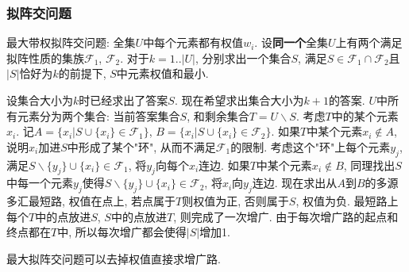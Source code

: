 \subsubsection{拟阵交问题}
最大带权拟阵交问题: 全集$U$中每个元素都有权值$w_i$. 设\textbf{同一个}全集$U$上有两个满足拟阵性质的集族$\mathcal{F}_1$, $\mathcal{F}_2$. 对于$k=1..|U|$, 分别求出一个集合$S$, 满足$S\in \mathcal{F}_1 \cap\mathcal{F}_2$且$|S|$恰好为$k$的前提下, $S$中元素权值和最小.

设集合大小为$k$时已经求出了答案$S$. 现在希望求出集合大小为$k+1$的答案. 
$U$中所有元素分为两个集合: 当前答案集合$S$, 和剩余集合$T=U\backslash S$. 考虑$T$中的某个元素$x_i$. 记$A=\{x_i|S\cup \{x_i\}\in\mathcal{F}_1\}$, $B=\{x_i|S\cup \{x_i\}\in\mathcal{F}_2\}$.
如果$T$中某个元素$x_i\notin A$, 说明$x_i$加进$S$中形成了某个"环", 从而不满足$\mathcal{F}_1$的限制. 考虑这个"环"上每个元素$y_j$, 满足$S\backslash\{y_j\}\cup \{x_i\}\in\mathcal{F}_1$, 将$y_j$向每个$x_i$连边.
如果$T$中某个元素$x_i\notin B$, 同理找出$S$中每一个元素$y_j$使得$S\backslash\{y_j\}\cup \{x_i\}\in\mathcal{F}_2$, 将$x_i$向$y_j$连边.
现在求出从$A$到$B$的多源多汇最短路, 权值在点上, 若点属于$T$则权值为正, 否则属于$S$, 权值为负. 最短路上每个$T$中的点放进$S$, $S$中的点放进$T$, 则完成了一次增广.
由于每次增广路的起点和终点都在$T$中, 所以每次增广都会使得$|S|$增加1.

最大拟阵交问题可以去掉权值直接求增广路.